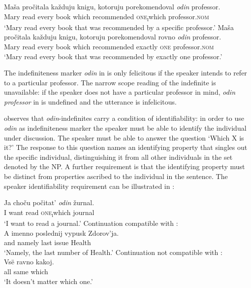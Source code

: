 \documentclass[output=paper,colorlinks,citecolor=brown]{langscibook}
\begin{document}
\ea
\ea\label{geist:ex:odin-scope-a}
\gll Maša pročitala každuju knigu, kotoruju porekomendoval \textit{odin} professor.\\
Mary read every book which recommended \textsc{one\textsubscript{i}}which professor.\textsc{nom}\\
\glt ‘Mary read every book that was recommended by a specific professor.’
\z
\ex\label{geist:ex:odin-scope-b}
\gll Maša pročitala každuju knigu, kotoruju porekomendoval rovno \textit{odin} professor.\\
Mary read every book which recommended exactly     
\textsc{one} professor.\textsc{nom}\\
\glt ‘Mary read every book that was recommended by exactly one professor.’
\z\z\z

\noindent The indefiniteness marker \textit{odin} in  is only felicitous if the speaker intends to refer to a particular professor. The narrow scope reading of the indefinite is unavailable: if the speaker does not have a particular professor in mind, \textit{odin professor} in  is undefined and the utterance is infelicitous.

\citeauthor{Ionin2013} observes that \textit{odin}-indefinites carry a condition of identifiability: in order to use \textit{odin} as indefiniteness marker the speaker must be able to identify the individual under discussion. The speaker must be able to answer the question `Which X is it?' The response to this question names an identifying property that singles out the specific individual, distinguishing it from all other individuals in the set denoted by the NP. A further requirement is that the identifying property must be distinct from properties ascribed to the individual in the sentence. The speaker identifiability requirement can be illustrated in :
\largerpage[2]

\ea\label{geist:ex:odin-ident}
\gll Ja choču počitat’ \textit{odin} žurnal.\\
I want read \textsc{one\textsubscript{i}}which journal\\
\glt `I want to read a journal.'
\ea Continuation compatible with :\label{geist:ex:odin-ident-a}\\
\gll A imenno poslednij vypusk Zdorov’ja.\\
and namely last issue Health\\
\glt ‘Namely, the last number of Health.’
\ex Continuation not compatible with :\label{geist:ex:odin-ident-b}\\
\gll Vsë ravno kakoj.\\
all same which\\
\glt ‘It doesn’t matter which one.’
\z\z
\end{document}
